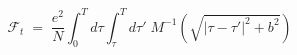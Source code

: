 \begin{equation}\label{eq:ft1}
{\mathcal F}_t\;=\; \frac{e^2}{N} \int_0^T d\tau \int_\tau^T d\tau' \; 
M^{-1}(\sqrt{|\tau - \tau'|^2 + b^2})
\end{equation}

